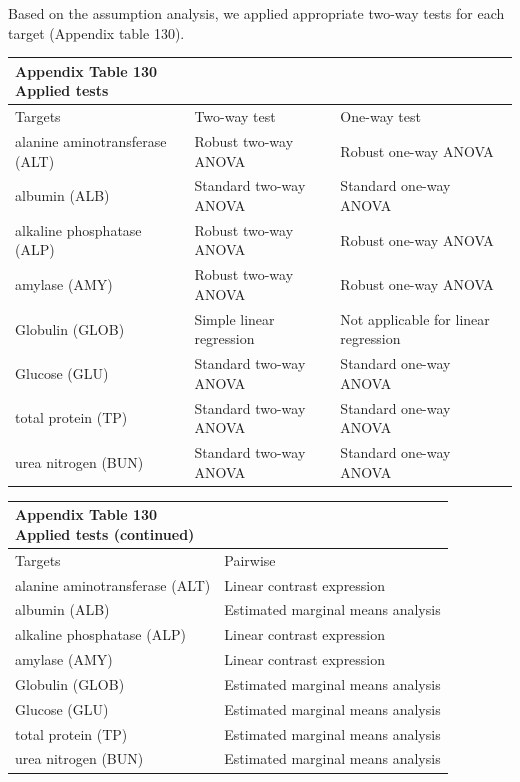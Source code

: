 \documentclass[
  12pt,
  letterpaper,
]{article}
\begin{document}
Based on the assumption analysis, we applied appropriate two-way tests for each target (Appendix table 130).

\begingroup
\fontsize{12.0pt}{14.4pt}\selectfont
\begin{longtable}{l|ll}
\caption*{
{\large \textbf{Appendix Table 130}} \\ 
{\small \textbf{Applied tests}}
} \\ 
\toprule
Targets & {Two-way test} & {One-way test} \\ 
\midrule\addlinespace[2.5pt]
alanine aminotransferase (ALT) & Robust two-way ANOVA & Robust one-way ANOVA \\ 
albumin (ALB) & Standard two-way ANOVA & Standard one-way ANOVA \\ 
alkaline phosphatase (ALP) & Robust two-way ANOVA & Robust one-way ANOVA \\ 
amylase (AMY) & Robust two-way ANOVA & Robust one-way ANOVA \\ 
Globulin (GLOB) & Simple linear regression & Not applicable for linear regression \\ 
Glucose (GLU) & Standard two-way ANOVA & Standard one-way ANOVA \\ 
total protein (TP) & Standard two-way ANOVA & Standard one-way ANOVA \\ 
urea nitrogen (BUN) & Standard two-way ANOVA & Standard one-way ANOVA \\ 
\bottomrule
\end{longtable}
\endgroup

\begingroup
\fontsize{12.0pt}{14.4pt}\selectfont
\begin{longtable}{l|l}
\caption*{
{\large \textbf{Appendix Table 130}} \\ 
{\small \textbf{Applied tests (continued)}}
} \\ 
\toprule
Targets & {Pairwise} \\ 
\midrule\addlinespace[2.5pt]
alanine aminotransferase (ALT) & Linear contrast expression \\ 
albumin (ALB) & Estimated marginal means analysis \\ 
alkaline phosphatase (ALP) & Linear contrast expression \\ 
amylase (AMY) & Linear contrast expression \\ 
Globulin (GLOB) & Estimated marginal means analysis \\ 
Glucose (GLU) & Estimated marginal means analysis \\ 
total protein (TP) & Estimated marginal means analysis \\ 
urea nitrogen (BUN) & Estimated marginal means analysis \\ 
\bottomrule
\end{longtable}
\endgroup
\end{document}
